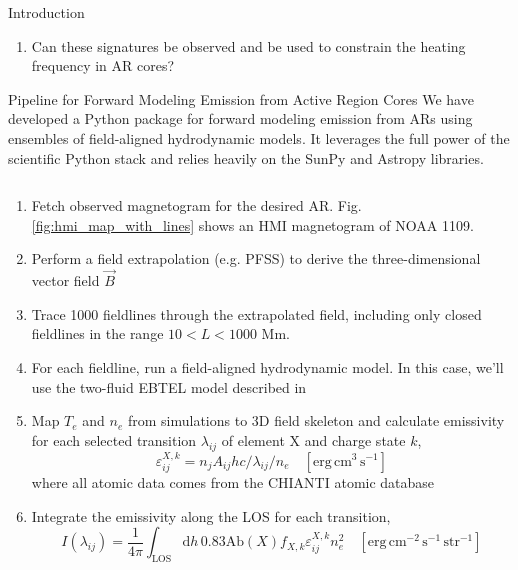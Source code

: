 \documentclass[final]{beamer}
\begin{document}
\begin{frame}
\begin{columns}[T]
\begin{column}{0.49\linewidth}
\begin{block}{Introduction}
\begin{itemize}
\begin{enumerate}
        \item \alert{Can these signatures be observed and be used to constrain the heating frequency in AR cores?}
      \end{enumerate}
    \end{itemize}
    \end{block}
    \begin{block}{Pipeline for Forward Modeling Emission from Active Region Cores}
    We have developed a Python package for forward modeling emission from ARs using ensembles of field-aligned hydrodynamic models. It leverages the full power of the scientific Python stack and relies heavily on the SunPy \citep{sunpy_community_sunpypython_2015} and Astropy \citep{astropy_collaboration_astropy:_2013} libraries.
      \begin{columns}[T]
      \begin{column}{0.59\columnwidth}
        \begin{enumerate}
        \item Fetch observed magnetogram for the desired AR. Fig. \ref{fig:hmi_map_with_lines} shows an HMI magnetogram of NOAA 1109. 
        \item Perform a field extrapolation (e.g. PFSS) to derive the three-dimensional vector field $\vec{B}$
        \item Trace 1000 fieldlines through the extrapolated field, including only closed fieldlines in the range $10<L<1000$ Mm.
        \item For each fieldline, run a field-aligned hydrodynamic model. In this case, we'll use the two-fluid EBTEL model described in \citet{barnes_inference_2016}
        \item Map $T_e$ and $n_e$ from simulations to 3D field skeleton and calculate emissivity for each selected transition $\lambda_{ij}$ of element $\mathrm{X}$ and charge state $k$,
          \begin{equation*}
            \varepsilon_{ij}^{X,k} = n_jA_{ij}hc/\lambda_{ij}/n_e \quad [\mathrm{erg}\,\mathrm{cm}^{3}\,\mathrm{s}^{-1}]
          \end{equation*}
          where all atomic data comes from the CHIANTI atomic database \citep{young_chianti_2016,dere_chianti_1997}
        \item Integrate the emissivity along the LOS for each transition,
          \begin{equation*}
            I(\lambda_{ij}) = \frac{1}{4\pi}\int_{\mathrm{LOS}}\mathrm{d}h\,0.83\mathrm{Ab}(X)f_{X,k}\varepsilon_{ij}^{X,k}n_e^2 \quad [\mathrm{erg}\,\mathrm{cm}^{-2}\,\mathrm{s}^{-1}\,\mathrm{str}^{-1}]

\end{equation*}
\end{enumerate}
\end{column}
\end{columns}
\end{block}
\end{column}
\end{columns}
\end{frame}
\end{document}
